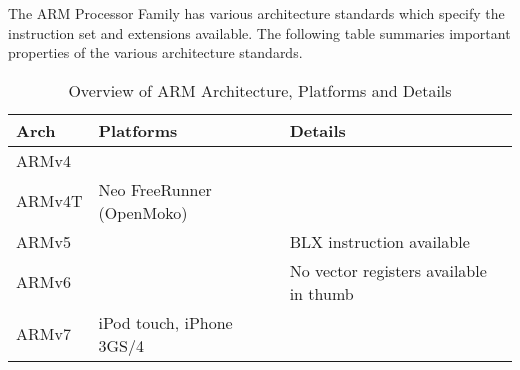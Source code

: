 The ARM Processor Family has various architecture standards which specify
the instruction set and extensions available. The following table summaries
important properties of the various architecture standards.

\begin{table}[h]
\begin{tabular}{lll}
Arch   & Platforms & Details \\
\hline
ARMv4  & & \\
\hline
ARMv4T & Neo FreeRunner (OpenMoko) & \\
\hline
ARMv5  & & BLX instruction available \\
\hline
ARMv6  & & No vector registers available in thumb \\
\hline
ARMv7  & iPod touch, iPhone 3GS/4 & \\ 
\hline
\end{tabular}
\caption{Overview of ARM Architecture, Platforms and Details}
\end{table}

\newpage


